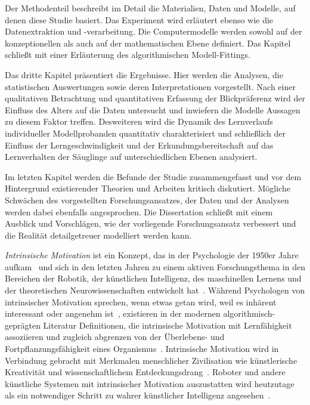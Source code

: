 \documentclass[a4paper]{scrreprt}
\begin{document}
Der Methodenteil beschreibt im Detail die Materialien, Daten und Modelle, auf denen diese Studie basiert. Das Experiment wird erl\"autert ebenso wie die Datenextraktion und -verarbeitung. Die Computermodelle werden sowohl auf der konzeptionellen als auch auf der mathematischen Ebene definiert. Das Kapitel schlie\ss t mit einer Erl\"auterung des algorithmischen Modell-Fittings.

Das dritte Kapitel pr\"asentiert die Ergebnisse. Hier werden die Analysen, die statistischen Auswertungen sowie deren Interpretationen vorgestellt. Nach einer qualitativen Betrachtung und quantitativen Erfassung der Blickpr\"aferenz wird der Einfluss des Alters auf die Daten untersucht und inwiefern die Modelle Aussagen zu diesem Faktor treffen. Desweiteren wird die Dynamik des Lernverlaufs individueller Modellprobanden quantitativ charakterisiert und schlie\ss lich der Einfluss der Lerngeschwindigkeit und der Erkundungsbereitschaft auf das Lernverhalten der S\"auglinge auf unterschiedlichen Ebenen analysiert.

Im letzten Kapitel werden die Befunde der Studie zusammengefasst und vor dem Hintergrund existierender Theorien und Arbeiten kritisch diskutiert. M\"ogliche Schw\"achen des vorgestellten Forschungsansatzes, der Daten und der Analysen werden dabei ebenfalls angesprochen. Die Dissertation schlie\ss t mit einem Ausblick und Vorschl\"agen, wie der vorliegende Forschungsansatz verbessert und die Realit\"at detailgetreuer modelliert werden kann.

\quad

\textit{Intrinsische Motivation} ist ein Konzept, das in der Psychologie der 1950er Jahre aufkam~\cite{harlow50,harlow50b,berlyne54,white59} und sich in den letzten Jahren zu einem aktiven Forschungsthema in den Bereichen der Robotik, der k\"unstlichen Intelligenz, des maschinellen Lernens und der theoretischen Neurowissenschaften entwickelt hat~\cite{baldassarre13}. W\"ahrend Psychologen von intrinsischer Motivation sprechen, wenn etwas getan wird, weil es inh\"arent interessant oder angenehm ist~\cite{ryan00b}, existieren in der modernen algorithmisch-gepr\"agten Literatur Definitionen, die intrinsische Motivation mit Lernf\"ahigkeit assoziieren und zugleich abgrenzen von der \"Uberlebens- und Fortpflanzungsf\"ahigkeit eines Organismus~\cite{mirolli13}. Intrinsische Motivation wird in Verbindung gebracht mit Merkmalen menschlicher Zivilisation wie k\"unstlerische Kreativit\"at und wissenschaftlichem Entdeckungsdrang~\cite{ryan00,schmidhuber10}. Roboter und andere k\"unstliche Systemen mit intrinsischer Motivation auszustatten wird heutzutage als ein notwendiger Schritt zu wahrer k\"unstlicher Intelligenz angesehen~\cite{weng01}.
\end{document}
